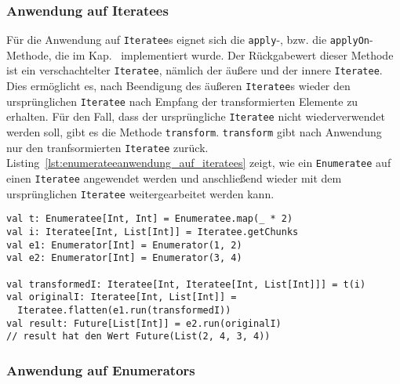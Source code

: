 

\subsubsection{Anwendung auf Iteratees} %
\label{ssub:enumerateeanwendung_auf_iteratees}

Für die Anwendung auf \lstinline|Iteratee|s eignet sich die \lstinline|apply|-, bzw. die \lstinline|applyOn|-Methode, die im Kap.~ implementiert wurde.
Der Rückgabewert dieser Methode ist ein verschachtelter \lstinline|Iteratee|, nämlich der äußere und der innere \lstinline|Iteratee|.
Dies ermöglicht es, nach Beendigung des äußeren \lstinline|Iteratee|s wieder den ursprünglichen \lstinline|Iteratee| nach Empfang der transformierten Elemente zu erhalten.
Für den Fall, dass der ursprüngliche \lstinline|Iteratee| nicht wiederverwendet werden soll, gibt es die Methode \lstinline|transform|.
\lstinline|transform| gibt nach Anwendung nur den tranfsormierten \lstinline|Iteratee| zurück.
Listing~\ref{lst:enumerateeanwendung_auf_iteratees} zeigt, wie ein \lstinline|Enumeratee| auf einen \lstinline|Iteratee| angewendet werden und anschließend wieder mit dem ursprünglichen \lstinline|Iteratee| weitergearbeitet werden kann.

\begin{lstlisting}[caption=Enumerateeanwendung auf Iteratees, label=lst:enumerateeanwendung_auf_iteratees]
val t: Enumeratee[Int, Int] = Enumeratee.map(_ * 2)
val i: Iteratee[Int, List[Int]] = Iteratee.getChunks
val e1: Enumerator[Int] = Enumerator(1, 2)
val e2: Enumerator[Int] = Enumerator(3, 4)

val transformedI: Iteratee[Int, Iteratee[Int, List[Int]]] = t(i)
val originalI: Iteratee[Int, List[Int]] =
  Iteratee.flatten(e1.run(transformedI))
val result: Future[List[Int]] = e2.run(originalI)
// result hat den Wert Future(List(2, 4, 3, 4))
\end{lstlisting}


\subsubsection{Anwendung auf Enumerators} %
\label{ssub:enumerateeanwendung_auf_enumerators}

